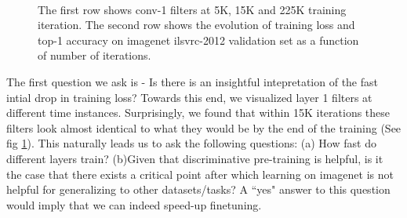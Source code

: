 \documentclass[runningheads]{llncs}
\begin{document}
\begin{figure}[t!]
 \\
\caption{The first row shows conv-1 filters at 5K, 15K and 225K training iteration. The second row shows the evolution of training loss and top-1 accuracy on imagenet ilsvrc-2012 validation set as a function of number of iterations.}
\label{fig:conv1}
\end{figure}

The first question we ask is - Is there is an insightful intepretation of the fast intial drop in training loss? Towards this end, we visualized layer 1 filters at different time instances. Surprisingly, we found that within 15K iterations these filters look almost identical to what they would be by the end of the training (See fig \ref{fig:conv1}). This naturally leads us to ask the following questions: (a) How fast do different layers train? (b)Given that discriminative pre-training is helpful, is it the case that there exists a critical point after which learning on imagenet is not helpful for generalizing to other datasets/tasks? A ``yes" answer to this question would imply that we can indeed speed-up finetuning.
\end{document}
